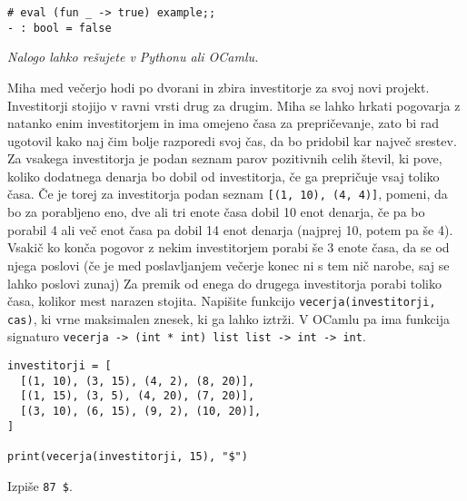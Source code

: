 \documentclass[arhiv]{../izpit}
\begin{document}
\begin{verbatim}
# eval (fun _ -> true) example;;
- : bool = false
\end{verbatim}



\naloga

\emph{Nalogo lahko rešujete v Pythonu ali OCamlu.}

Miha med večerjo hodi po dvorani in zbira investitorje za svoj novi projekt.
Investitorji stojijo v ravni vrsti drug za drugim.
Miha se lahko hrkati pogovarja z natanko enim investitorjem in ima omejeno časa za prepričevanje,
zato bi rad ugotovil kako naj čim bolje razporedi svoj čas, da bo pridobil kar največ srestev.
Za vsakega investitorja je podan seznam parov pozitivnih celih števil, ki pove, koliko dodatnega denarja bo dobil od investitorja, če ga prepričuje vsaj toliko časa.
Če je torej za investitorja podan seznam \verb|[(1, 10), (4, 4)]|, pomeni, da bo za porabljeno eno, dve ali tri enote časa dobil
10 enot denarja, če pa bo porabil 4 ali več enot časa pa dobil 14 enot denarja (najprej 10, potem pa še 4).
Vsakič ko konča pogovor z nekim investitorjem porabi še 3 enote časa, da se od njega poslovi
(če je med poslavljanjem večerje konec ni s tem nič narobe, saj se lahko poslovi zunaj)
Za premik od enega do drugega investitorja porabi toliko časa, kolikor mest narazen stojita.
Napišite funkcijo \verb|vecerja(investitorji, cas)|, ki vrne maksimalen znesek, ki ga lahko iztrži.
V OCamlu pa ima funkcija signaturo \verb|vecerja -> (int * int) list list -> int -> int|.

\begin{verbatim}
investitorji = [
  [(1, 10), (3, 15), (4, 2), (8, 20)],
  [(1, 15), (3, 5), (4, 20), (7, 20)],
  [(3, 10), (6, 15), (9, 2), (10, 20)],
]

print(vecerja(investitorji, 15), "$")
\end{verbatim}
Izpiše \verb|87 $|.
\end{document}
